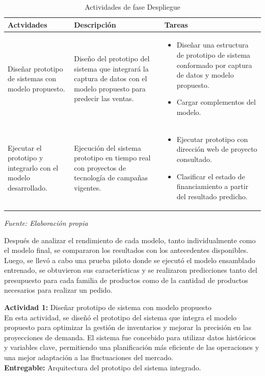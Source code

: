 		\begin{table}[H]
			\centering
			\caption{Actividades de fase Despliegue}
			\begin{tabular}{L{3cm}|L{5cm}|L{5cm}}
				
				Actvidades & Descripción & Tareas \\
				\hline \hline
				Diseñar prototipo de sistemas con modelo propuesto. & Diseño del prototipo del sistema que integrará la captura de datos con el modelo propuesto para predecir las ventas. &  
				\begin{itemize}
					\item Diseñar una estructura de prototipo de sistema conformado por captura de datos y modelo propuesto.
					\item Cargar complementos del modelo.
				\end{itemize}
				\\
				\hline
				Ejecutar el prototipo y integrarlo con el modelo desarrollado. & Ejecución del sistema prototipo en tiempo real con proyectos de tecnología de campañas vigentes. &
				\begin{itemize}
					\item Ejecutar prototipo con dirección web de proyecto consultado.
					\item Clasificar el estado de financiamiento a partir del resultado predicho.
				\end{itemize}
				\\
				\hline		
			\end{tabular}	
			\newline
			\newline \textit{Fuente: Elaboración propia}
			\label{tab:fase_despl}
		\end{table}
		
		Después de analizar el rendimiento de cada modelo, tanto individualmente como el modelo final, se compararon los resultados con los antecedentes disponibles. Luego, se llevó a cabo una prueba piloto donde se ejecutó el modelo ensamblado entrenado, se obtuvieron sus características y se realizaron predicciones tanto del presupuesto para cada familia de productos como de la cantidad de productos necesarios para realizar un pedido.
		
		\textbf{Actividad 1: } Diseñar prototipo de sistema con modelo propuesto\\
		En esta actividad, se diseñó el prototipo del sistema que integra el modelo propuesto para optimizar la gestión de inventarios y mejorar la precisión en las proyecciones de demanda. El sistema fue concebido para utilizar datos históricos y variables clave, permitiendo una planificación más eficiente de las operaciones y una mejor adaptación a las fluctuaciones del mercado.\\
		\textbf{Entregable: }Arquitectura del prototipo del sistema integrado.
		
